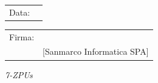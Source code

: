 \documentclass[a4paper,12pt]{article}
\begin{document}
\vfill

\begin{flushleft}
\begin{tabular}{@{}p{0.5in}p{2in}@{}}
Data: & \hrulefill \\
\end{tabular}

\vspace{1em}

\begin{tabular}{@{}p{0.5in}p{2in}@{}}
Firma: & \hrulefill \\
& [Sanmarco Informatica SPA] \\
\end{tabular}
\end{flushleft}

\begin{flushright}
    \textit{7-ZPUs}
\end{flushright}
\end{document}
